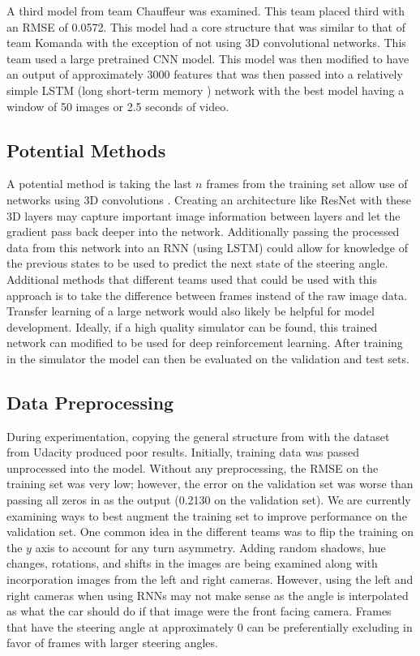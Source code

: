\documentclass[10pt,twocolumn,letterpaper]{article}
\begin{document}
A third model from team Chauffeur was examined. This team placed third with an RMSE of 0.0572. This model had a core structure that was similar to that of team Komanda with the exception of not using 3D convolutional networks. This team used a large pretrained CNN model. This model was then modified to have an output of approximately 3000 features that was then passed into a relatively simple LSTM (long short-term memory \cite{hochreiter1997long}) network with the best model having a window of 50 images or 2.5 seconds of video.



\subsection{Potential Methods}

A potential method is taking the last $n$ frames from the training set allow use of networks using 3D convolutions \cite{Tran_2015_ICCV}. Creating an architecture like ResNet with these 3D layers may capture important image information between layers and let the gradient pass back deeper into the network. Additionally passing the processed data from this network into an RNN (using LSTM) could allow for knowledge of the previous states to be used to predict the next state of the steering angle. Additional methods that different teams used that could be used with this approach is to take the difference between frames instead of the raw image data. Transfer learning of a large network would also likely be helpful for model development. Ideally, if a high quality simulator can be found, this trained network can modified to be used for deep reinforcement learning. After training in the simulator the model can then be evaluated on the validation and test sets.

\subsection{Data Preprocessing}
During experimentation, copying the general structure from \cite{bojarski2016end} with the dataset from Udacity produced poor results. Initially, training data was passed unprocessed into the model. Without any preprocessing, the RMSE on the training set was very low; however, the error on the validation set was worse than passing all zeros in as the output (0.2130 on the validation set). We are currently examining ways to best augment the training set to improve performance on the validation set. One common idea in the different teams was to flip the training on the $y$ axis to account for any turn asymmetry. Adding random shadows, hue changes, rotations, and shifts in the images are being examined along with incorporation images from the left and right cameras. However, using the left and right cameras when using RNNs may not make sense as the angle is interpolated as what the car should do if that image were the front facing camera. Frames that have the steering angle at approximately 0 can be preferentially excluding in favor of frames with larger steering angles.
\end{document}
